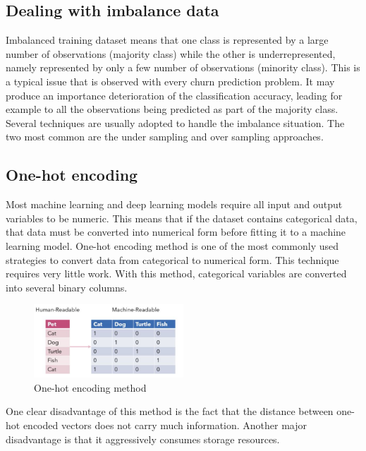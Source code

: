 \documentclass[LaM,binding=0.6cm, english]{sapthesis}
\begin{document}
\subsection{Dealing with imbalance data}

Imbalanced training dataset means that one class is represented by a large number of observations (majority class) while the other is underrepresented, namely represented by only a few number of observations (minority class). This is a typical issue that is observed with every churn prediction problem. It may produce an importance deterioration of the classification accuracy, leading for example to all the observations being predicted as part of the majority class. Several techniques are usually adopted to handle the imbalance situation. The two most common are the under sampling and over sampling approaches.\cite{Barandela2004}

\subsection{One-hot encoding}

Most machine learning and deep learning models require all input and output variables to be numeric. This means that if the dataset contains categorical data, that data must be converted into numerical form before fitting it to a machine learning model. One-hot encoding method is one of the most commonly used strategies to convert data from categorical to numerical form. This technique requires very little work. With this method, categorical variables are converted into several binary columns.

\begin{figure}[h!]
    \includegraphics[width=0.5\textwidth]{images/One-hot_encoding.jpg}
    \centering
    \caption{One-hot encoding method}
    \label{fig:one-hot-encoding}
\end{figure}

\par One clear disadvantage of this method is the fact that the distance between one-hot encoded vectors does not carry much information. Another major disadvantage is that it aggressively consumes storage resources.\cite{Hancock2020}
\end{document}
